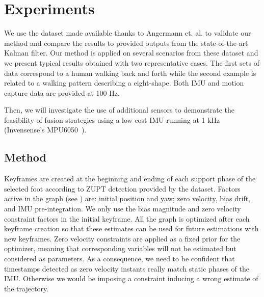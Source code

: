 
\section{Experiments} \label{sec:experiments}

We use the dataset made available thanks to Angermann et. al. \cite{angermann2010high} to validate our method and compare the results to provided outputs from the state-of-the-art Kalman filter.
Our method is applied on several scenarios from these dataset and we present typical results obtained with two representative cases. The first sets of data correspond to a human walking back and forth 
while the second example is related to a walking pattern describing a eight-shape. Both IMU and motion capture data are provided at 100 Hz.

Then, we will investigate the use of additional sensors to demonstrate the feasibility of fusion strategies using a low cost IMU running at 1 kHz (Invensense's MPU6050~\cite{InvenSense}).


\subsection{Method}

Keyframes are created at the beginning and ending of each support phase of the selected foot according to ZUPT detection provided by the dataset. Factors active in the graph (see ) are: initial position and yaw; zero velocity, bias drift, and IMU pre-integration. We only use the bias magnitude 
and zero velocity constraint factors in the initial keyframe. All the graph is optimized after each keyframe creation so that these estimates can be used for future estimations with new keyframes. Zero velocity constraints are applied 
as a fixed prior for the optimizer, meaning that corresponding variables will not be estimated but considered as parameters. As a consequence, we need to be confident that timestamps detected as zero velocity instants really match static phases of the IMU. 
Otherwise we would be imposing a constraint inducing a wrong estimate of the trajectory.

